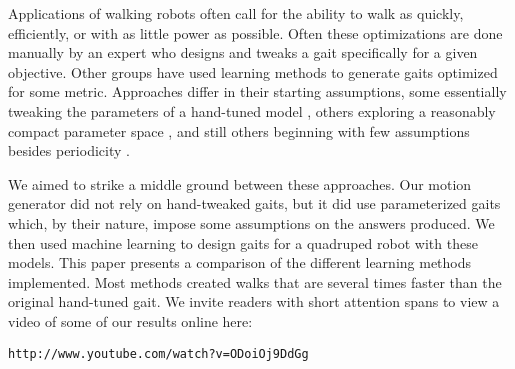 






Applications of walking robots often call for the ability to walk as
quickly, efficiently, or with as little power as possible.  Often
these optimizations are done manually by an expert who designs and
tweaks a gait specifically for a given objective.  Other groups have
used learning methods to generate gaits optimized for some metric.
Approaches differ in their starting assumptions, some essentially
tweaking the parameters of a hand-tuned model \cite{chernova}, others
exploring a reasonably compact parameter space \cite{kohl}, and still
others beginning with few assumptions besides periodicity
\cite{zykov}.

We aimed to strike a middle ground between these approaches.  Our
motion generator did not rely on hand-tweaked gaits, but it did use
parameterized gaits which, by their nature, impose some assumptions on
the answers produced.  We then used machine learning to design gaits
for a quadruped robot with these models.  This paper presents a
comparison of the different learning methods implemented.  Most
methods created walks that are several times faster than the original
hand-tuned gait.  We invite readers with short attention spans to view
a video of some of our results online here:

\texttt{http://www.youtube.com/watch?v=ODoiOj9DdGg}

